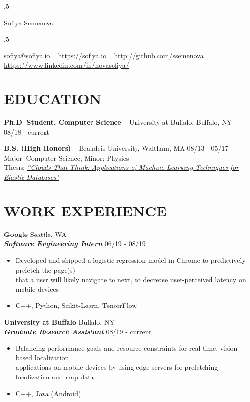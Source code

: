 \documentclass{res}
\begin{document}
 \moveleft.5\hoffset\centerline{\namefont Sofiya Semenova}
 \smallskip
 \moveleft.5\hoffset\centerline{\href{mailto:sofiya@sofiya.io}{sofiya@sofiya.io} ~ \href{https://sofiya.io}{https://sofiya.io} ~ \href{http://github.com/ssemenova}{http://github.com/ssemenova} ~ \href{https://www.linkedin.com/in/novasofiya/}{https://www.linkedin.com/in/novasofiya/}}


\vspace{-4mm}

\begin{resume}


\section{EDUCATION}

\textbf{Ph.D. Student, Computer Science} ~ University at Buffalo, Buffalo, NY \hfill 08/18 - current

\textbf{B.S. (High Honors)} ~ Brandeis University, Waltham, MA \hfill 08/13 - 05/17 \\
	Major: Computer Science, Minor: Physics \\
	Thesis: \href{https://sofiya.io/media/thesis.pdf}{\sl “Clouds That Think: Applications of Machine Learning Techniques for Elastic Databases"}

\section{WORK EXPERIENCE}

\textbf{Google} \hfill Seattle, WA \\
\textbf{\textit{Software Engineering Intern}} \hfill 06/19 - 08/19 \\
	\begin{itemize}   \itemsep -2pt %
	\item Developed and shipped a logistic regression model in Chrome to predictively prefetch the page(s) \\
	that a user will likely navigate to next, to decrease user-perceived latency on mobile devices
	\item C++, Python, Scikit-Learn, TensorFlow
	\end{itemize}

\textbf{University at Buffalo} \hfill Buffalo, NY \\
\textbf{\textit{ Graduate Research Assistant}} \hfill 08/19 - current \\
	\begin{itemize}   \itemsep -2pt %
	\item Balancing performance goals and resource constraints for real-time, vision-based localization \\
	applications on mobile devices by using edge servers for prefetching localization and map data
	\item C++, Java (Android)
	\end{itemize}


\end{resume}
\end{document}
